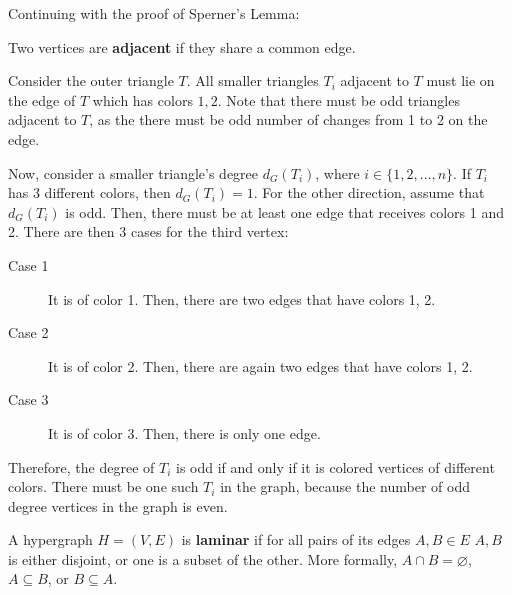 
Continuing with the proof of Sperner's Lemma:

\begin{definition}
	Two vertices are \textbf{adjacent} if they share a common edge.
\end{definition}

\begin{replacementproof}
	Consider the outer triangle \( T \). All smaller triangles \( T_i \) adjacent to \( T \) must lie on the edge of \( T \) which has colors \( 1,2 \). Note that there must be odd triangles adjacent to \( T \), as the there must be odd number of changes from 1 to 2 on the edge.

	Now, consider a smaller triangle's degree \( d_G(T_i) \), where \( i \in \{1, 2, \ldots , n\}   \). If \( T_i \) has 3 different colors, then \( d_G(T_i) =1\). For the other direction, assume that \( d_G(T_i) \) is odd. Then, there must be at least one edge that receives colors 1 and 2. There are then 3 cases for the third vertex:
	\begin{description}
		\item[Case 1] It is of color 1. Then, there are two edges that have colors 1, 2.
		\item[Case 2] It is of color 2. Then, there are again two edges that have colors 1, 2.
		\item[Case 3] It is of color 3. Then, there is only one edge.
	\end{description}
	Therefore, the degree of \( T_i \) is odd if and only if it is colored vertices of different colors. There must be one such \( T_i \) in the graph, because the number of odd degree vertices in the graph is even.
\end{replacementproof}

\begin{definition}
	A hypergraph \( H=(V, E) \) is \textbf{laminar} if for all pairs of its edges \( A, B \in E \) \( A,B \) is either disjoint, or one is a subset of the other. More formally, \( A \cap B = \varnothing \), \( A \subseteq B \), or \( B \subseteq A \).
\end{definition}

